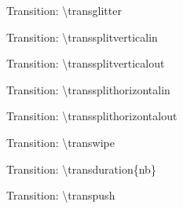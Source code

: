 \documentclass[english,sectioncirclenumberstyle]{ciadbeamer}
\begin{document}
\begin{frame}[c]{Transition: {\textbackslash}transglitter}
	\transglitter
	\begin{center}
	\end{center}
\end{frame}

\begin{frame}[c]{Transition: {\textbackslash}transsplitverticalin}
	\transsplitverticalin
	\begin{center}
	\end{center}
\end{frame}

\begin{frame}[c]{Transition: {\textbackslash}transsplitverticalout}
	\transsplitverticalout
	\begin{center}
	\end{center}
\end{frame}

\begin{frame}[c]{Transition: {\textbackslash}transsplithorizontalin}
	\transsplithorizontalin
	\begin{center}
	\end{center}
\end{frame}

\begin{frame}[c]{Transition: {\textbackslash}transsplithorizontalout}
	\transsplithorizontalout
	\begin{center}
	\end{center}
\end{frame}

\begin{frame}[c]{Transition: {\textbackslash}transwipe}
	\transwipe
	\begin{center}
	\end{center}
\end{frame}

\begin{frame}[c]{Transition: {\textbackslash}transduration\{nb\}}
	\begin{center}
	\end{center}
\end{frame}

\begin{frame}[c]{Transition: {\textbackslash}transpush}
	\transpush
	\begin{center}
	\end{center}
\end{frame}
\end{document}
